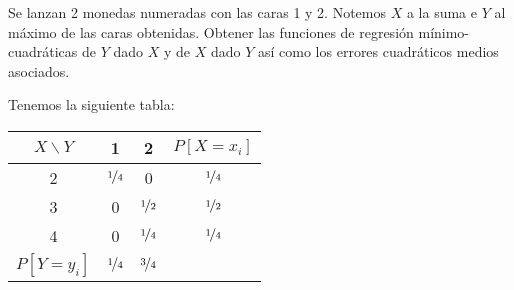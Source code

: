 \begin{ejercicio}
    Se lanzan 2 monedas numeradas con las caras 1 y 2. Notemos $X$ a la suma e $Y$ al máximo de las caras obtenidas. Obtener las funciones de regresión mínimo-cuadráticas de $Y$ dado $X$ y de $X$ dado $Y$ así como los errores cuadráticos medios asociados.

    Tenemos la siguiente tabla:
    \begin{center}
        \begin{tabular}{c|cc|c}
            $X\backslash Y$ & 1 & 2 & $P[X=x_i]$\\
            \hline
            2 & $\nicefrac{1}{4}$ & 0 & $\nicefrac{1}{4}$\\
            3 & 0 & $\nicefrac{1}{2}$ & $\nicefrac{1}{2}$\\
            4 & 0 & $\nicefrac{1}{4}$ & $\nicefrac{1}{4}$\\
            \hline
            $P[Y=y_i]$ & $\nicefrac{1}{4}$ & $\nicefrac{3}{4}$\\
        \end{tabular}
    \end{center}
\end{ejercicio}